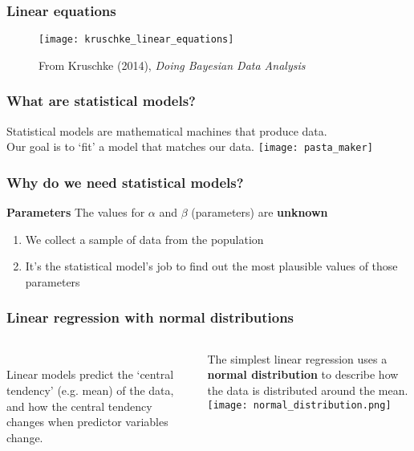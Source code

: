 \documentclass{beamer}
\begin{document}
\begin{frame}
  \frametitle{Linear equations}
  \begin{figure}
  \texttt{[image: kruschke\_linear\_equations]}
  \caption{\tiny{From Kruschke (2014), \textit{Doing Bayesian Data Analysis}}}
\end{figure}
\end{frame}
\begin{frame}
  \frametitle{What are statistical models?}
  Statistical models are mathematical machines that produce data.\\
  Our goal is to `fit' a model that matches our data.
  \texttt{[image: pasta\_maker]}
\end{frame}
\begin{frame}
  \frametitle{Why do we need statistical models?}
  \begin{block}{\textbf{Parameters}}
    The values for $\alpha$ and $\beta$ (parameters) are \textbf{unknown}
  \end{block}
  \begin{enumerate}
    \item We collect a sample of data from the population
    \item It's the statistical model's job to find out the most plausible values of those parameters
  \end{enumerate}
\end{frame}
\iffalse
\begin{frame}
  \frametitle{Noisy data: regression}
  We can never predict values 100\%, so statistical models try to understand what happens
  \alert{\textit{on average}}. \\ \vspace{1cm}
  There will always be error in our model, which is the difference between the predicted values and the raw data.
\end{frame}
\fi
\begin{frame}
  \frametitle{Linear regression with normal distributions}
  \begin{columns}
    \\
    \vspace{-1cm}
  Linear models predict the `central tendency' (e.g. mean) of the data,
  and how the central tendency changes when predictor variables change. \\
    \vspace{0.5cm}

  The simplest linear regression uses a \textbf{normal distribution} to describe how the data is distributed around the mean.
  \texttt{[image: normal\_distribution.png]}
\end{columns}
\end{frame}
\end{document}
